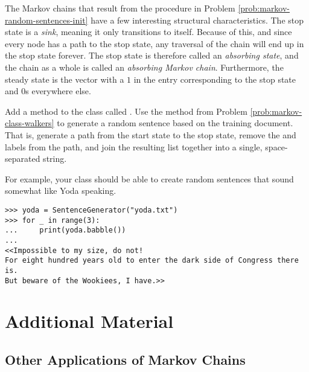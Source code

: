 \begin{info} %
The Markov chains that result from the procedure in Problem \ref{prob:markov-random-sentences-init} have a few interesting structural characteristics.
The stop state is a \emph{sink}, meaning it only transitions to itself.
Because of this, and since every node has a path to the stop state, any traversal of the chain will end up in the stop state forever.
The stop state is therefore called an \emph{absorbing state}, and the chain as a whole is called an \emph{absorbing Markov chain}.
Furthermore, the steady state is the vector with a $1$ in the entry corresponding to the stop state and $0$s everywhere else.
\end{info}

\begin{problem} %
\label{prob:markov-random-sentences-babble}
Add a method to the  class called .
Use the  method from Problem \ref{prob:markov-class-walkers} to generate a random sentence based on the training document.
That is, generate a path from the start state to the stop state, remove the  and  labels from the path, and join the resulting list together into a single, space-separated string.

For example, your  class should be able to create random sentences that sound somewhat like Yoda speaking.

\begin{lstlisting}
>>> yoda = SentenceGenerator("yoda.txt")
>>> for _ in range(3):
... 	print(yoda.babble())
...
<<Impossible to my size, do not!
For eight hundred years old to enter the dark side of Congress there is.
But beware of the Wookiees, I have.>>
\end{lstlisting}
\end{problem}

\newpage

\section*{Additional Material} %

\subsection*{Other Applications of Markov Chains} %

